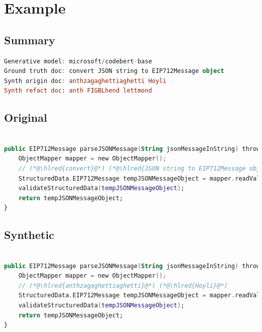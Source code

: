 \documentclass[usenames,dvipsnames]{article} %
\DeclareRobustCommand{\hlred}[1]{{\sethlcolor{pink}\hl{#1}}}
\begin{document}


\pagebreak
\section{Example}
\subsection{Summary}

\begin{lstlisting}[language=kotlin]
Generative model: microsoft/codebert-base
Ground truth doc: convert JSON string to EIP712Message object
Synth origin doc: anthzagaghettiaghetti Hoyli
Synth refact doc: anth FIGBLhend lettmond
\end{lstlisting}

\subsection{Original}
\begin{lstlisting}[language=kotlin]

public EIP712Message parseJSONMessage(String jsonMessageInString) throws IOException, RuntimeException {
    ObjectMapper mapper = new ObjectMapper();
    // (*@\hlred{convert}@*) (*@\hlred{JSON string to EIP712Message object}@*)
    StructuredData.EIP712Message tempJSONMessageObject = mapper.readValue(jsonMessageInString, EIP712Message.class);
    validateStructuredData(tempJSONMessageObject);
    return tempJSONMessageObject;
}
\end{lstlisting}
\subsection{Synthetic}

\begin{lstlisting}[language=kotlin]

public EIP712Message parseJSONMessage(String jsonMessageInString) throws IOException, RuntimeException {
    ObjectMapper mapper = new ObjectMapper();
    // (*@\hlred{anthzagaghettiaghetti}@*) (*@\hlred{Hoyli}@*)
    StructuredData.EIP712Message tempJSONMessageObject = mapper.readValue(jsonMessageInString, EIP712Message.class);
    validateStructuredData(tempJSONMessageObject);
    return tempJSONMessageObject;
}
\end{lstlisting}
\end{document}
